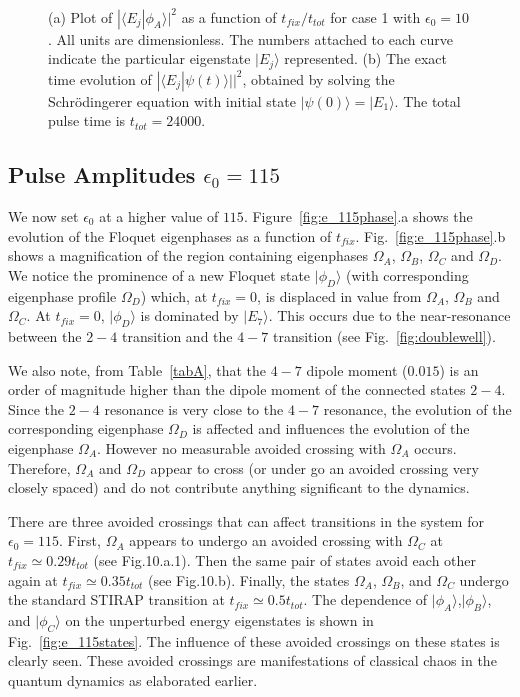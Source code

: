 \begin{figure}
\ 
\caption{(a) Plot of $|{\langle}E_j|{\phi}_A{\rangle}|^2$ as a function of $t_{fix}/t_{tot}$ for case 1 with ${\epsilon}_0=10$. All units are dimensionless. The numbers attached to each curve indicate the particular eigenstate $|E_j{\rangle}$ represented. (b) The exact time evolution of $|{\langle}E_j|{\psi}(t){\rangle|}|^2$, obtained by solving the Schr\"odingerer equation with initial state $|\psi(0){\rangle}=|E_1{\rangle}$. The total pulse time is $t_{tot}=24000$.}
\label{fig:e_10states}
\end{figure}
%
%
\subsection{Pulse Amplitudes $\epsilon_0 = 115$}
%
%

We now  set $\epsilon_0$ at a higher value of $115$.  Figure~\ref{fig:e_115phase}.a   shows the evolution of the Floquet eigenphases as a function of $t_{fix}$. Fig.~\ref{fig:e_115phase}.b shows a magnification of the region containing eigenphases $\Omega_A$, $\Omega_B$, $\Omega_C$ and $\Omega_D$. We notice the prominence of a new Floquet state $\vert\phi_D\rangle$ (with corresponding eigenphase profile $\Omega_D$)  which,  at $t_{fix}=0$, is displaced in value from  $\Omega_A$, $\Omega_B$ and $\Omega_C$.  At $t_{fix}=0$, $\vert\phi_D\rangle$ is dominated by $\vert E_7\rangle$. This occurs due to the near-resonance between the $2-4$ transition and the $4-7$ transition (see Fig.~\ref{fig:doublewell}).

We also note, from Table~\ref{tabA}, that the $4-7$ dipole moment ($0.015$) is an order of magnitude higher than the dipole moment of the connected states $2-4$. Since the $2-4$ resonance is very close to the $4-7$ resonance, the evolution of the corresponding eigenphase $\Omega_D$ is affected and influences the evolution of the eigenphase $\Omega_A$. However no measurable avoided crossing with $\Omega_A$ occurs. Therefore,  $\Omega_A$ and $\Omega_D$ appear to cross (or under go an avoided crossing very closely spaced) and do not contribute anything significant to the dynamics. 

There are three avoided crossings that can affect transitions in the system for ${\epsilon}_0=115$.  First,  $\Omega_A$ appears  to undergo an avoided crossing with $\Omega_C$ at $t_{fix}\simeq 0.29 t_{tot}$ 
(see Fig.10.a.1). Then the same pair of states avoid each other again at  $t_{fix}\simeq 0.35 t_{tot}$ (see Fig.10.b). Finally, the states $\Omega_A$, $\Omega_B$, and $\Omega_C$ undergo the standard STIRAP transition at $t_{fix}\simeq 0.5 t_{tot}$.  The dependence of $\vert\phi_A\rangle$,$\vert\phi_B\rangle$, and $\vert\phi_C\rangle$ on the unperturbed energy eigenstates is shown in Fig.~\ref{fig:e_115states}.  The influence of these avoided crossings on these states is clearly seen. These avoided crossings are manifestations of classical chaos in the quantum dynamics as elaborated earlier.

